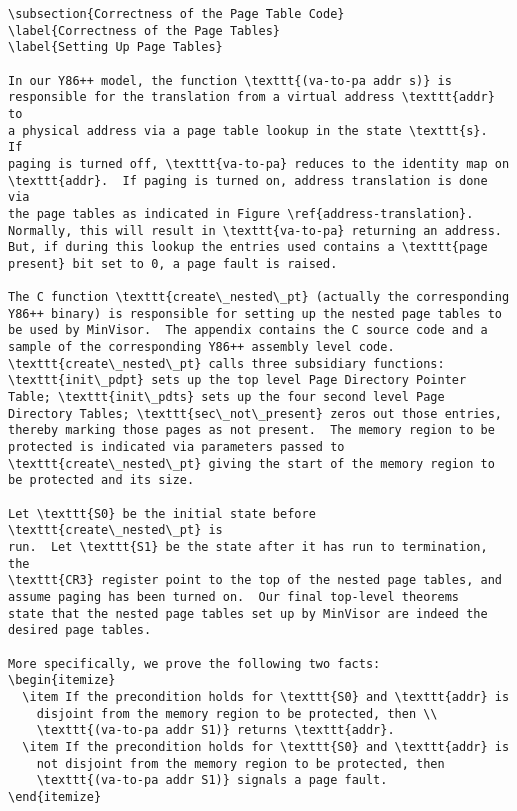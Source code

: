\documentclass[submission,copyright]{eptcs} \providecommand{\event}{ACL2 2011}
\begin{document}
\begin{verbatim}
\subsection{Correctness of the Page Table Code}
\label{Correctness of the Page Tables}
\label{Setting Up Page Tables}

In our Y86++ model, the function \texttt{(va-to-pa addr s)} is
responsible for the translation from a virtual address \texttt{addr} to
a physical address via a page table lookup in the state \texttt{s}.  If
paging is turned off, \texttt{va-to-pa} reduces to the identity map on
\texttt{addr}.  If paging is turned on, address translation is done via
the page tables as indicated in Figure \ref{address-translation}.
Normally, this will result in \texttt{va-to-pa} returning an address.
But, if during this lookup the entries used contains a \texttt{page
present} bit set to 0, a page fault is raised.

The C function \texttt{create\_nested\_pt} (actually the corresponding
Y86++ binary) is responsible for setting up the nested page tables to
be used by MinVisor.  The appendix contains the C source code and a
sample of the corresponding Y86++ assembly level code.
\texttt{create\_nested\_pt} calls three subsidiary functions:
\texttt{init\_pdpt} sets up the top level Page Directory Pointer
Table; \texttt{init\_pdts} sets up the four second level Page
Directory Tables; \texttt{sec\_not\_present} zeros out those entries,
thereby marking those pages as not present.  The memory region to be
protected is indicated via parameters passed to
\texttt{create\_nested\_pt} giving the start of the memory region to
be protected and its size.

Let \texttt{S0} be the initial state before \texttt{create\_nested\_pt} is
run.  Let \texttt{S1} be the state after it has run to termination, the
\texttt{CR3} register point to the top of the nested page tables, and
assume paging has been turned on.  Our final top-level theorems
state that the nested page tables set up by MinVisor are indeed the
desired page tables.

More specifically, we prove the following two facts:
\begin{itemize}
  \item If the precondition holds for \texttt{S0} and \texttt{addr} is
    disjoint from the memory region to be protected, then \\
    \texttt{(va-to-pa addr S1)} returns \texttt{addr}.
  \item If the precondition holds for \texttt{S0} and \texttt{addr} is
    not disjoint from the memory region to be protected, then 
    \texttt{(va-to-pa addr S1)} signals a page fault.
\end{itemize}


\end{verbatim}
\end{document}
